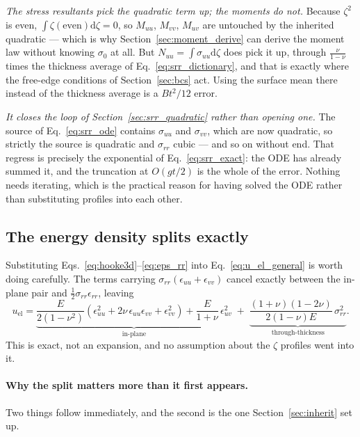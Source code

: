 \documentclass[11pt]{article}
\begin{document}
\emph{The stress resultants pick the quadratic term up; the moments do not.}
Because $\zeta^{2}$ is even, $\int\zeta\left(\text{even}\right)\mathrm d\zeta = 0$,
so $M_{uu}$, $M_{vv}$, $M_{uv}$ are untouched by the inherited quadratic --- which
is why Section~\ref{sec:moment_derive} can derive the moment law without knowing
$\sigma_{0}$ at all. But $N_{uu} = \int\sigma_{uu}\mathrm d\zeta$ does pick it up,
through $\frac{\nu}{1-\nu}$ times the thickness average of
Eq.~\eqref{eq:srr_dictionary}, and that is exactly where the free-edge conditions
of Section~\ref{sec:bcs} act. Using the surface mean there instead of the
thickness average is a $Bt^{2}/12$ error.

\emph{It closes the loop of Section~\ref{sec:srr_quadratic} rather than opening
one.} The source of Eq.~\eqref{eq:srr_ode} contains $\sigma_{uu}$ and
$\sigma_{vv}$, which are now quadratic, so strictly the source is quadratic and
$\sigma_{rr}$ cubic --- and so on without end. That regress is precisely the
exponential of Eq.~\eqref{eq:srr_exact}: the ODE has already summed it, and the
truncation at $O\!\left(gt/2\right)$ is the whole of the error. Nothing needs
iterating, which is the practical reason for having solved the ODE rather than
substituting profiles into each other.

\subsection{The energy density splits exactly}\label{sec:energy_split}
Substituting Eqs.~\eqref{eq:hooke3d}--\eqref{eq:eps_rr} into
Eq.~\eqref{eq:u_el_general} is worth doing carefully. The terms carrying
$\sigma_{rr}\left(\epsilon_{uu}+\epsilon_{vv}\right)$ cancel exactly between
the in-plane pair and $\tfrac12\sigma_{rr}\epsilon_{rr}$, leaving
\begin{equation}\label{eq:energy_split}
    \boxed{\;u_{\mathrm{el}} =
      \underbrace{\frac{E}{2\left(1-\nu^{2}\right)}
        \left(\epsilon_{uu}^{2} + 2\nu\,\epsilon_{uu}\epsilon_{vv}
          + \epsilon_{vv}^{2}\right)
        + \frac{E}{1+\nu}\,\epsilon_{uv}^{2}}_{\text{in-plane}}
      \;+\;
      \underbrace{\frac{\left(1+\nu\right)\left(1-2\nu\right)}
        {2\left(1-\nu\right)E}\,\sigma_{rr}^{2}}_{\text{through-thickness}}.\;}
\end{equation}
This is exact, not an expansion, and no assumption about the $\zeta$ profiles went
into it.

\paragraph{Why the split matters more than it first appears.} Two things follow
immediately, and the second is the one Section~\ref{sec:inherit} set up.
\end{document}
